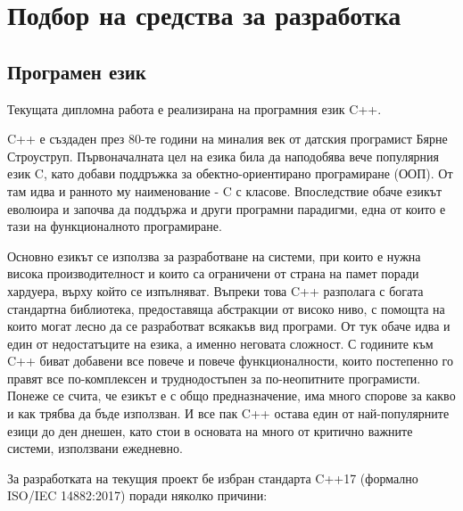 \section{Подбор на средства за разработка}

\subsection{Програмен език}

Текущата дипломна работа е реализирана на програмния език C++.

C++ е създаден през 80-те години на миналия век от датския програмист Бярне
Строуструп. Първоначалната цел на езика била да наподобява вече популярния език
C, като добави поддръжка за обектно-ориентирано програмиране (ООП). От там идва
и ранното му наименование - C с класове. Впоследствие обаче езикът еволюира и
започва да поддържа и други програмни парадигми, една от които е тази на
функционалното програмиране.



Основно езикът се използва за разработване на системи, при които е нужна висока
производителност и които са ограничени от страна на памет поради хардуера,
върху който се изпълняват. Въпреки това C++ разполага с богата стандартна
библиотека, предоставяща абстракции от високо ниво, с помощта на които могат
лесно да се разработват всякакъв вид програми. От тук обаче идва и един от
недостатъците на езика, а именно неговата сложност. С годините към C++ биват
добавени все повече и повече функционалности, които постепенно го правят все
по-комплексен и труднодостъпен за по-неопитните програмисти. Понеже се счита, че
езикът е с общо предназначение, има много спорове за какво и как трябва да бъде
използван. И все пак C++ остава един от най-популярните езици до ден днешен,
като стои в основата на много от критично важните системи, използвани ежедневно.

За разработката на текущия проект бе избран стандарта C++17 (формално
ISO/IEC 14882:2017) поради няколко причини:

